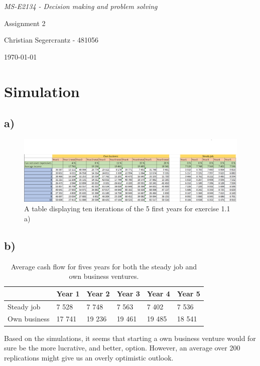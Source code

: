 \documentclass{article}
\begin{document}
	\textit{MS-E2134 - Decision making and problem solving}
	\vfill
	{\centering \Huge Assignment 2 \par}
	\vfill
	Christian Segercrantz - 481056 \\
	\par \today
	\pagebreak
	\tableofcontents
	\pagebreak
\section{Simulation}
\subsection{a)}
\begin{figure}[H]
	\includegraphics[width=\textwidth]{1a.png}
	\caption{A table displaying ten iterations of the 5 first years for exercise 1.1 a)}
	\label{fig:1a}
\end{figure}

\subsection{b)}

	\begin{table}[h]
		\centering
		\caption{Average cash flow for fives years for both the steady job and own business ventures.}
		\label{tab:1b}
		\begin{tabular}{l|l|l|l|l|l|}
			\cline{2-6}
			& Year 1 & Year 2 & Year 3 & Year 4 & Year 5 \\ \hline
			\multicolumn{1}{|l|}{Steady job}   & 7 528  & 7 748  & 7 563  & 7 402  & 7 536  \\ \hline
			\multicolumn{1}{|l|}{Own business} & 17 741 & 19 236 & 19 461 & 19 485 & 18 541 \\ \hline
		\end{tabular}
	\end{table}
	
	Based on the simulations, it seems that starting a own business venture would for sure be the more lucrative, and better, option. However, an average over 200 replications might give us an overly optimistic outlook.
\end{document}
